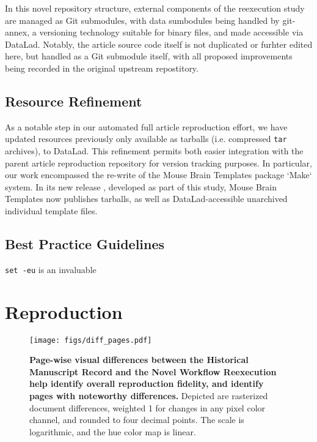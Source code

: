 In this novel repository structure, external components of the reexecution study are managed as Git submodules, with data sumbodules being handled by git-annex, a versioning technology suitable for binary files, and made accessible via DataLad.
Notably, the article source code itself is not duplicated or furhter edited here, but handled as a Git submodule itself, with all proposed improvements being recorded in the original upstream repostitory.


\subsection{Resource Refinement}

As a notable step in our automated full article reproduction effort, we have updated resources previously only available as tarballs (i.e. compressed \texttt{tar} archives), to DataLad.
This refinement permits both easier integration with the parent article reproduction repository for version tracking purposes.
In particular, our work encompassed the re-write of the Mouse Brain Templates package \cite{mbt05}  `Make` system.
In its new release \cite{mbt10}, developed as part of this study, Mouse Brain Templates now publishes tarballs, as well as DataLad-accessible unarchived individual template files.

\subsection{Best Practice Guidelines}

\texttt{set -eu} is an invaluable


\section{Reproduction}



\begin{figure}
	\centering
	\texttt{[image: figs/diff\_pages.pdf]}
	\caption{
		\textbf{Page-wise visual differences between the Historical Manuscript Record and the Novel Workflow Reexecution help identify overall reproduction fidelity, and identify pages with noteworthy differences.}
		Depicted are rasterized document differences, weighted 1 for changes in any pixel color channel, and rounded to four decimal points.
		The scale is logarithmic, and the hue color map is linear.
	}
	\label{fig:diff_pages}
\end{figure}

